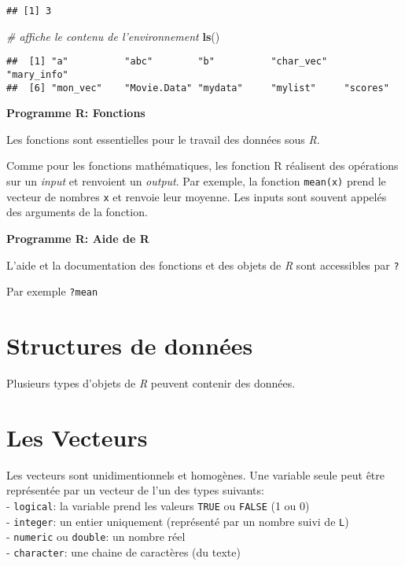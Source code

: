 \documentclass[]{book}
\newenvironment{Shaded}{\begin{snugshade}}{\end{snugshade}}
\newcommand{\CommentTok}[1]{\textcolor[rgb]{0.56,0.35,0.01}{\textit{#1}}}
\newcommand{\KeywordTok}[1]{\textcolor[rgb]{0.13,0.29,0.53}{\textbf{#1}}}
\newcommand{\NormalTok}[1]{#1}
\begin{document}
\begin{verbatim}
## [1] 3
\end{verbatim}

\begin{Shaded}
\begin{Highlighting}[]
\CommentTok{# affiche le contenu de l'environnement}
\KeywordTok{ls}\NormalTok{()}
\end{Highlighting}
\end{Shaded}

\begin{verbatim}
##  [1] "a"          "abc"        "b"          "char_vec"   "mary_info" 
##  [6] "mon_vec"    "Movie.Data" "mydata"     "mylist"     "scores"
\end{verbatim}

\textbf{Programme R: Fonctions}

Les fonctions sont essentielles pour le travail des données sous \emph{R}.

Comme pour les fonctions mathématiques, les fonction R réalisent des opérations sur un \emph{input} et renvoient un \emph{output}.
Par exemple, la fonction \texttt{mean(x)} prend le vecteur de nombres \texttt{x} et renvoie leur moyenne.
Les inputs sont souvent appelés des arguments de la fonction.

\textbf{Programme R: Aide de R}

L'aide et la documentation des fonctions et des objets de \emph{R} sont accessibles par \texttt{?}

Par exemple \texttt{?mean}

\hypertarget{structures-de-donnees-1}{%
\section{Structures de données}\label{structures-de-donnees-1}}

Plusieurs types d'objets de \emph{R} peuvent contenir des données.

\hypertarget{les-vecteurs-1}{%
\section{Les Vecteurs}\label{les-vecteurs-1}}

Les vecteurs sont unidimentionnels et homogènes.
Une variable seule peut être représentée par un vecteur de l'un des types suivants:\\
- \texttt{logical}: la variable prend les valeurs \texttt{TRUE} ou \texttt{FALSE} (1 ou 0)\\
- \texttt{integer}: un entier uniquement (représenté par un nombre suivi de \texttt{L})\\
- \texttt{numeric} ou \texttt{double}: un nombre réel\\
- \texttt{character}: une chaine de caractères (du texte)
\end{document}
